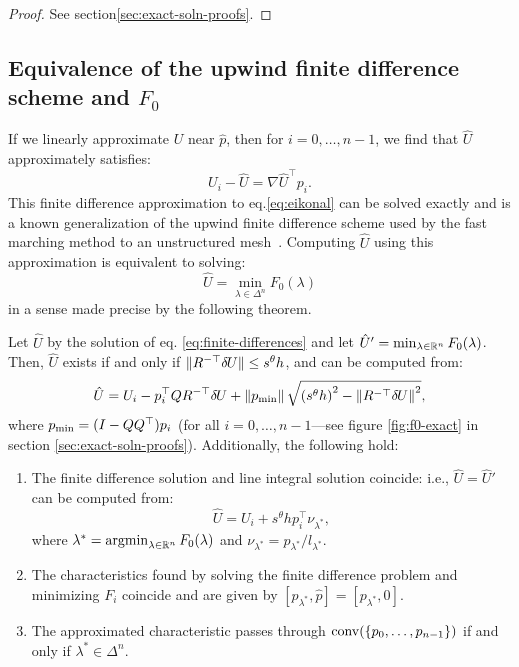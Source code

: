 \documentclass[smallcondensed]{svjour3}
\begin{document}
\begin{proof}
  See section\@ \ref{sec:exact-soln-proofs}.
\end{proof}

\subsection{Equivalence of the upwind finite difference scheme and
  $F_0$}\label{ssec:equivalence}

If we linearly approximate $U$ near $\hat{p}$, then for
$i = 0, \hdots, n - 1$, we find that $\hat{U}$ approximately
satisfies:
\begin{equation}
  \label{eq:finite-differences}
  U_i - \hat{U} = \nabla \hat{U}^\top p_i.
\end{equation}
This finite difference approximation to eq.\@ \ref{eq:eikonal} can
be solved exactly and is a known generalization of the upwind finite
difference scheme used by the fast marching method to an unstructured
mesh~\cite{kimmel1998computing,sethian2000fast}. Computing $\hat{U}$
using this approximation is equivalent to solving:
\begin{equation}
  \hat{U} = \min_{\lambda \in \Delta^n} F_0(\lambda)
\end{equation}
in a sense made precise by the following theorem.

\begin{theorem}\label{thm:equivalence}
  Let $\hat{U}$ by the solution of eq.\@
  \ref{eq:finite-differences} and let
  $\hat{U}' = \min_{\lambda \in \mathbb{R}^n} F_0(\lambda)$. Then, $\hat{U}$
  exists if and only if $\|R^{-\top} {\delta \hspace{-0.09em} U}\| \leq s^\theta h$, and can
  be computed from:
  \begin{equation}
    \label{eq:U-finite-diff}
    \hat{U} = U_i - p_i^\top Q R^{-\top} {\delta \hspace{-0.09em} U} + \left\|p_{\operatorname{min}}\right\| \sqrt{{(s^\theta h)}^2 - \left\|R^{-\top} {\delta \hspace{-0.09em} U}\right\|^2},
  \end{equation}
  where $p_{\operatorname{min}} = (I - QQ^\top) p_i$ (for all
  $i = 0, \hdots, n - 1$---see figure \ref{fig:f0-exact} in section\@
  \ref{sec:exact-soln-proofs}). Additionally, the following hold:
  \begin{enumerate}
  \item The finite difference solution and line integral solution
    coincide: i.e., $\hat{U} = \hat{U}'$ can be computed from:
    \begin{equation}
      \label{eq:U-from-Ui-exact}
      \hat{U} = U_i + s^\theta h p_i^\top \nu_{\lambda^*},
    \end{equation}
    where $\lambda^* = \operatorname{argmin}_{\lambda \in \mathbb{R}^n} F_0(\lambda)$ and
    $\nu_{\lambda^*} = p_{\lambda^*}/l_{\lambda^*}$.
  \item The characteristics found by solving the finite difference
    problem and minimizing $F_i$ coincide and are given by
    $[p_{\lambda^*}, \hat{p}] = [p_{\lambda^*}, 0]$.
  \item The approximated characteristic passes through
    $\operatorname{conv}(\left\{p_0, \hdots, p_{n-1}\right\})$ if and only if
    $\lambda^* \in \Delta^n$.
  \end{enumerate}
\end{theorem}
\end{document}
